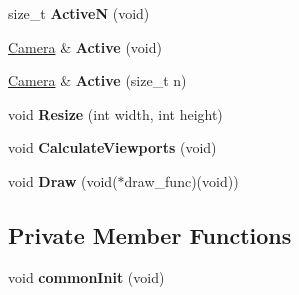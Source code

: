 \begin{DoxyCompactItemize}
\item 
\hypertarget{class_cameras_aaf404448da0f438645827ee3558bf077}{size\-\_\-t {\bfseries \-Active\-N} (void)}\label{class_cameras_aaf404448da0f438645827ee3558bf077}

\item 
\hypertarget{class_cameras_a66a0741c023da5ef362f501ea255d65e}{\hyperlink{class_camera}{\-Camera} \& {\bfseries \-Active} (void)}\label{class_cameras_a66a0741c023da5ef362f501ea255d65e}

\item 
\hypertarget{class_cameras_a8e6b90d6a3f2b3654ee02c703172c98d}{\hyperlink{class_camera}{\-Camera} \& {\bfseries \-Active} (size\-\_\-t n)}\label{class_cameras_a8e6b90d6a3f2b3654ee02c703172c98d}

\item 
\hypertarget{class_cameras_a72155a9003f5976b455482d65d0a61ff}{void {\bfseries \-Resize} (int width, int height)}\label{class_cameras_a72155a9003f5976b455482d65d0a61ff}

\item 
\hypertarget{class_cameras_ab3bdf41248da9246efeeea4302136c11}{void {\bfseries \-Calculate\-Viewports} (void)}\label{class_cameras_ab3bdf41248da9246efeeea4302136c11}

\item 
\hypertarget{class_cameras_adaca996b6dac14e2db89c31ff369d3b4}{void {\bfseries \-Draw} (void($\ast$draw\-\_\-func)(void))}\label{class_cameras_adaca996b6dac14e2db89c31ff369d3b4}

\end{DoxyCompactItemize}
\subsection*{\-Private \-Member \-Functions}
\begin{DoxyCompactItemize}
\item 
\hypertarget{class_cameras_ab3b5bb710ab76cacf8c9177a29b1bc8b}{void {\bfseries common\-Init} (void)}\label{class_cameras_ab3b5bb710ab76cacf8c9177a29b1bc8b}

\end{DoxyCompactItemize}
